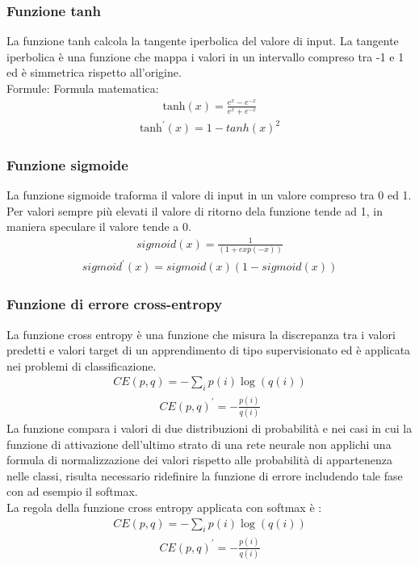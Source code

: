 \subsubsection{Funzione tanh}
La funzione tanh calcola la tangente iperbolica del valore di input. La tangente iperbolica è una funzione che mappa i valori in un intervallo compreso tra -1 e 1 ed è simmetrica rispetto all'origine.\\
Formule:
Formula matematica:
\begin{align*}
\text{tanh}(x) = \frac{e^x - e^{-x}}{e^x + e^{-x}} 
\end{align*}
\begin{align*}
\text{tanh}^{\prime}(x) = 1 - tanh(x)^2
\end{align*}
\subsubsection{Funzione sigmoide}
La funzione sigmoide traforma il valore di input in un valore compreso tra 0 ed 1. Per valori sempre più elevati il valore di ritorno dela funzione tende ad 1, in maniera speculare il valore tende a 0.
\begin{align*}
sigmoid(x) = \frac{1}{(1 + exp(-x))}
\end{align*}
\begin{align*}
sigmoid^{\prime}(x) = sigmoid(x)(1 - sigmoid(x))
\end{align*}
\subsubsection{Funzione di errore cross-entropy}
La funzione cross entropy è una funzione che misura la discrepanza tra i valori predetti e valori target di un apprendimento di tipo supervisionato ed è applicata nei problemi di classificazione.
\begin{align*}
CE(p,q) = -\sum_{i} p(i) \log(q(i))
\end{align*}
\begin{align*}
CE(p,q)^{\prime}= -\frac{p(i)}{q(i)}
\end{align*}
La funzione compara i valori di due distribuzioni di probabilità e nei casi in cui la funzione di attivazione dell'ultimo strato di una rete neurale non applichi una formula di normalizzazione dei valori rispetto alle probabilità di appartenenza nelle classi, risulta necessario ridefinire la funzione di errore includendo tale fase con ad esempio il softmax.\\
La regola della funzione cross entropy applicata con softmax è :
\begin{align*}
CE(p,q) = -\sum_{i} p(i) \log(q(i))
\end{align*}
\begin{align*}
CE(p,q)^{\prime} = -\frac{p(i)}{q(i)}
\end{align*}

